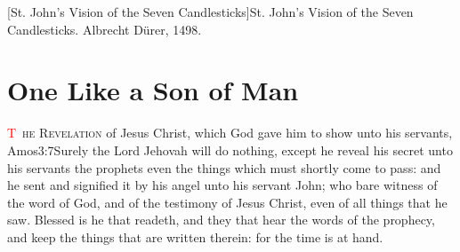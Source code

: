 [St. John's Vision of the Seven Candlesticks]{St. John's Vision of the Seven Candlesticks. Albrecht Dürer, 1498.}

\pagestyle{headings}
\mainmatter
\trimFrame
\chapter{One Like a Son of Man}
\begingroup
\let\clearpage\relax
\endgroup
\lettrine[lines=4]{\textcolor{red}{T}}{\ he Revelation} of Jesus Christ, which God gave him to show unto his servants,%
			{Amos}{3:7}{Surely the Lord Jehovah will do nothing, except he reveal his secret unto his servants the prophets}
 even the things which must shortly come to pass: and he sent and signified it by his angel unto his servant John; %
 who bare witness of the word of God, and of the testimony of Jesus Christ, even of all things that he saw. %
 Blessed is he that readeth, and they that hear the words of the prophecy, and keep the things that are written therein: for the time is at hand.
